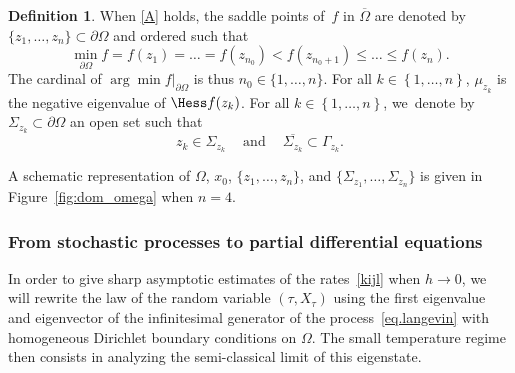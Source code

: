 \documentclass[10pt]{amsart}
\newcommand{\quand}{\quad\text{and}\quad}
\theoremstyle{plain}
\theoremstyle{definition}
\newtheorem{definition}[proposition]{Definition}
\begin{document}
\begin{definition}\label{eq.de-introd}
When \ref{A} holds, the saddle points of~$f$ in $\overline{\Omega}$ are denoted by $\{z_1,\ldots,z_n\} \subset
\partial \Omega$ and ordered such that
\begin{equation}\label{eq.n0}
\min_{\partial \Omega}f=f(z_1)=\ldots
= f(z_{n_0}) < f(z_{n_0+1}) \le \ldots \leq f(z_n).
\end{equation}
The cardinal of $\arg\min f|_{\partial \Omega}$ is thus $n_0 \in \{1,
\ldots, n\}$. For all $k\in \left\{1,\ldots,n\right\}$, $\mu_{z_k}$ is the negative eigenvalue of $\Hess f (z_k)$.
For all $k\in \left\{1,\ldots,n\right\}$, we~denote by
$\Sigma_{z_k} \subset \partial \Omega$ an open set such that
\begin{equation}\label{Sigma_k}
z_k \in \Sigma_{z_k} \ \quand \ \overline{\Sigma_{z_k} }\subset \Gamma_{z_k}.
\end{equation}
\end{definition}

A schematic representation of $\Omega$, $x_0$, $\{z_1,\ldots,z_n\}$, and $\{\Sigma_{z_1},\ldots, \Sigma_{z_n}\}$ is given in Figure~\ref{fig:dom_omega} when $n=4$.

\subsubsection{From stochastic processes to partial differential equations}
\label{sec.diri}

In order to give sharp asymptotic estimates of the rates~\eqref{kijl}
when $h \to 0$, we
will rewrite the law of the random variable $(\tau,X_\tau)$ using the
first eigenvalue and eigenvector of the infinitesimal generator of the
process~\eqref{eq.langevin} with homogeneous Dirichlet boundary
conditions on $\Omega$. The small temperature regime then consists in
analyzing the semi-classical limit of this eigenstate.
\end{document}
